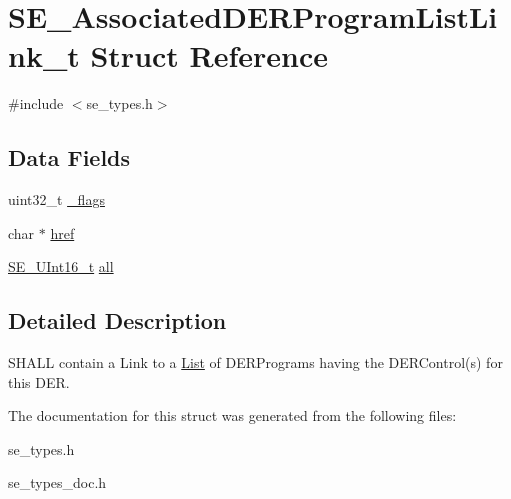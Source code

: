 \hypertarget{structSE__AssociatedDERProgramListLink__t}{}\section{S\+E\+\_\+\+Associated\+D\+E\+R\+Program\+List\+Link\+\_\+t Struct Reference}
\label{structSE__AssociatedDERProgramListLink__t}


{\ttfamily \#include $<$se\+\_\+types.\+h$>$}

\subsection*{Data Fields}
\begin{DoxyCompactItemize}
\item 
uint32\+\_\+t \hyperlink{group__AssociatedDERProgramListLink_ga9b18cb252039dc6e31f30c98082c817f}{\+\_\+flags}
\item 
char $\ast$ \hyperlink{group__AssociatedDERProgramListLink_ga0e6c12c3f2c05116497088b00af2e087}{href}
\item 
\hyperlink{group__UInt16_gac68d541f189538bfd30cfaa712d20d29}{S\+E\+\_\+\+U\+Int16\+\_\+t} \hyperlink{group__AssociatedDERProgramListLink_gaa873f04f67391ceb7ce2c75b236c85d4}{all}
\end{DoxyCompactItemize}


\subsection{Detailed Description}
S\+H\+A\+LL contain a Link to a \hyperlink{structList}{List} of D\+E\+R\+Programs having the D\+E\+R\+Control(s) for this D\+ER. 

The documentation for this struct was generated from the following files\+:\begin{DoxyCompactItemize}
\item 
se\+\_\+types.\+h\item 
se\+\_\+types\+\_\+doc.\+h\end{DoxyCompactItemize}

